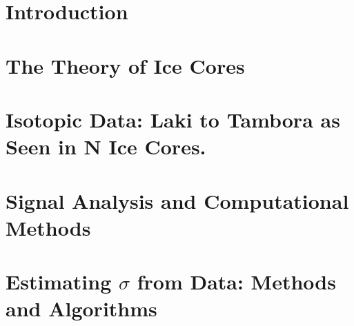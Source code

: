\documentclass[11pt]{memoir} %
\begin{document}
\newpage

\listoftodos

\tableofcontents*{}


\newpage
\listoffigures

\listoftables

\lstlistoflistings


\mainmatter

\chapter[Introduction][Introduction]{Introduction}




\chapter[Ice Theory][Ice Theory]{The Theory of Ice Cores}




\chapter[Data][Data]{Isotopic Data: Laki to Tambora as Seen in N Ice Cores.}





\chapter[Signal Analysis \& Comp. Meth.][Signal Analysis \& Comp. Meth.]{Signal Analysis and Computational Methods}





%


\chapter[Method][Method]{Estimating $\sigma$ from Data: Methods and Algorithms}


\end{document}
